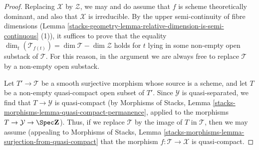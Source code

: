 \begin{proof}
Replacing $\mathcal{X}$ by $\mathcal{Z}$, we may and do assume that $f$ is
scheme theoretically dominant,
and also that $\mathcal{X}$ is irreducible.
By the upper semi-continuity of fibre dimensions
(Lemma \ref{stacks-geometry-lemma-relative-dimension-is-semi-continuous} (1)),
it suffices to prove that the equality
$\dim_t( \mathcal{T}_{f(t)}) =\dim \mathcal{T}  - \dim \mathcal{Z}$
holds for $t$ lying in
some non-empty open substack of $\mathcal{T}$.
For this reason, in the argument we are always free
to replace $\mathcal{T}$ by a non-empty open substack.

\medskip\noindent
Let $T' \to \mathcal{T}$ be a smooth surjective morphism whose source
is a scheme, and let $T$ be a non-empty quasi-compact open subset
of $T'$.  Since $\mathcal{Y}$ is quasi-separated, we find
that $T \to  \mathcal{Y}$ is quasi-compact
(by Morphisms of Stacks, Lemma
\ref{stacks-morphisms-lemma-quasi-compact-permanence}, applied to the morphisms
$T \to \mathcal{Y} \to \Spec \mathbf{Z}$).
Thus, if we replace $\mathcal{T}$ by the image of $T$ in $\mathcal{T}$,
then we may assume (appealing to
Morphisms of Stacks, Lemma
\ref{stacks-morphisms-lemma-surjection-from-quasi-compact}
that the morphism $f:\mathcal{T} \to \mathcal{X}$ is quasi-compact.


\end{proof}

